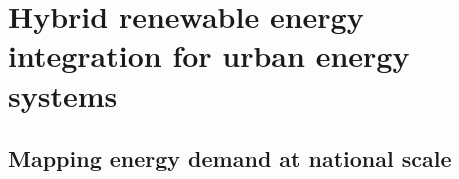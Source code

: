 \chapter{Hybrid renewable energy \mbox{integration} for urban energy systems}
\label{hybrid_chapter}

\section{Mapping energy demand at national scale}